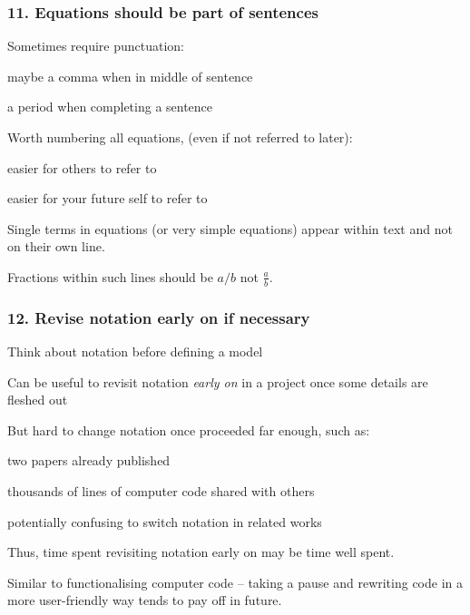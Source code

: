 \begin{frame}
\frametitle{11. Equations should be part of sentences}

Sometimes require punctuation:
\bi
\item maybe a comma when in middle of sentence
\item a period when completing a sentence
\ei

\pause

Worth numbering all equations, (even if not referred to later):
\bi
\item easier for others to refer to
\item easier for your future self to refer to
\ei

\pause

\medskip

Single terms in equations (or very simple equations) appear within
text and not on their own line.

\medskip

Fractions within such lines should be $a/b$ not $\frac{a}{b}$.

\end{frame}


\begin{frame}
\frametitle{12. Revise notation early on if necessary}

\bi
\item Think about notation before defining a model
\item Can be useful to revisit notation \emph{early on} in a project once some
  details are fleshed out
\item But hard to change notation once proceeded far enough, such as:
  \bi
  \item two papers already published
  \item thousands of lines of computer code shared with others
    \bi
  \item potentially confusing to switch notation in related works
    \ei
    \ei
\ei

Thus, time spent revisiting notation early on may be time well spent.

\pause

\medskip

Similar to functionalising computer code -- taking a
pause and rewriting code in a more user-friendly way tends to pay off in future.

\end{frame}

